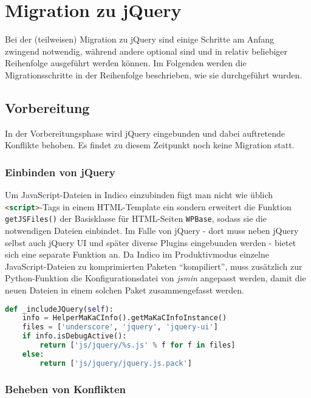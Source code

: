 \chapter{Migration zu jQuery}

Bei der (teilweisen) Migration zu jQuery sind einige Schritte am Anfang zwingend notwendig, während
andere optional sind und in relativ beliebiger Reihenfolge ausgeführt werden können. Im Folgenden
werden die Migrationsschritte in der Reihenfolge beschrieben, wie sie durchgeführt wurden.

\section{Vorbereitung}

In der Vorbereitungsphase wird jQuery eingebunden und dabei auftretende Konflikte behoben. Es findet
zu diesem Zeitpunkt noch keine Migration statt.

\subsection{Einbinden von jQuery}

Um JavaScript-Dateien in Indico einzubinden fügt man nicht wie üblich
\lstinline[language=HTML]{<script>}-Tags in einem HTML-Template ein sondern erweitert die Funktion
\lstinline{getJSFiles()} der Basisklasse für HTML-Seiten \lstinline{WPBase}, sodass sie die
notwendigen Dateien einbindet. Im Falle von jQuery - dort muss neben jQuery selbst auch jQuery UI
und später diverse Plugins eingebunden werden - bietet sich eine separate Funktion an. Da Indico im
Produktivmodus einzelne JavaScript-Dateien zu komprimierten Paketen \enquote{kompiliert}, muss
zusätzlich zur Python-Funktion die Konfigurationsdatei von \emph{jsmin} angepasst werden, damit die
neuen Dateien in einem solchen Paket zusammengefasst werden.

\begin{lstlisting}[language=Python,caption=Einbinden von jQuery und Underscore.js in Indico]
def _includeJQuery(self):
    info = HelperMaKaCInfo().getMaKaCInfoInstance()
    files = ['underscore', 'jquery', 'jquery-ui']
    if info.isDebugActive():
        return ['js/jquery/%s.js' % f for f in files]
    else:
        return ['js/jquery/jquery.js.pack']
\end{lstlisting}

\subsection{Beheben von Konflikten}

